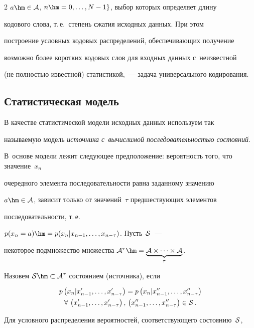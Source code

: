\begin{multicols}{2}
$a\hm\in{\cal A}$, $n\hm=0,\ldots,N-1\}$, выбор которых определяет длину 

кодового слова, т.\,е.\ степень сжатия исходных данных. При этом 

построение условных кодовых распределений, обеспечивающих получение 

возможно более коротких кодовых слов для входных данных с~неизвестной 

(не полностью известной) статистикой,~--- задача универсального кодирования.



\subsection{Статистическая модель}



В качестве статистической модели исходных данных используем так 

называемую модель \textit{источника с~вычислимой последовательностью состояний}. 

В~основе модели лежит следующее предположение: вероятность того, что значение~$x_n$ 

очередного элемента последовательности равна заданному значению

$a\hm\in{\cal A}$, зависит только от значений~$\tau$ предшествующих элементов 

последовательности, т.\,е.\ 

$p(x_n=a)\hm=p(x_n|x_{n-1},\ldots,x_{n-\tau})$. Пусть~${\cal S}$~--- 

некоторое подмножество множества  ${\cal A}^\tau \hm= 

\underbrace{{\cal A}\times\dots\times{\cal A}}_{\tau}$. 

Назовем ${\cal S}\hm\subset{\cal A}^\tau $ состоянием (источника), если

\begin{multline*}

p\left(x_n|x'_{n-1},\dots,x'_{n-\tau}\right) = 

p\left(x_n|x''_{n-1},\dots,x''_{n-\tau}\right)\\

\forall \, \left(x'_{n-1},\dots,x'_{n-\tau}\right),\,

\left(x''_{n-1},\dots,x''_{n-\tau}\right)\in{\cal S}\,.

\end{multline*}

Для условного распределения вероятностей, соответствующего состоянию~${\cal S}$, 


\end{multicols}
